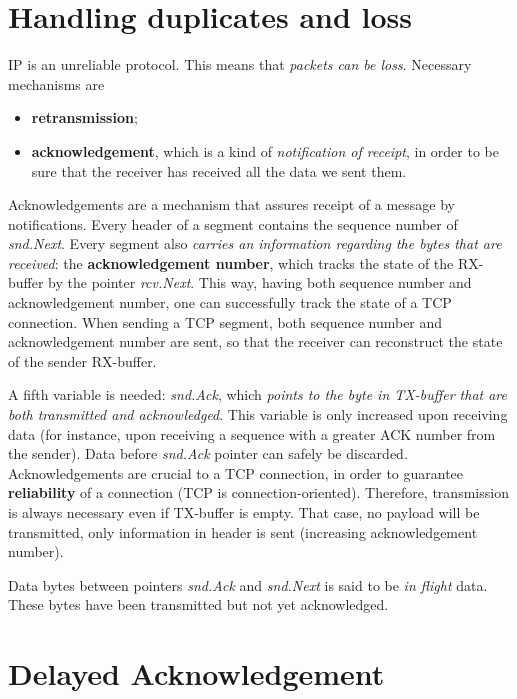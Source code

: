 \documentclass[a4paper, 11pt]{report}
\begin{document}
\section{Handling duplicates and loss}

IP is an unreliable protocol. This means that \emph{packets can be loss}.
Necessary mechanisms are

\begin{itemize}
	\item \textbf{retransmission};
	\item \textbf{acknowledgement}, which is a kind of \emph{notification
		of receipt}, in order to be sure that the receiver has received
		all the data we sent them.
\end{itemize}

Acknowledgements are a mechanism that assures receipt of a message by
notifications. Every header of a segment contains the sequence number of
\emph{snd.Next}. Every segment also \emph{carries an information regarding
the bytes that are received}: the \textbf{acknowledgement number}, which tracks
the state of the RX-buffer by the pointer \emph{rcv.Next}. This way, having
both sequence number and acknowledgement number, one can successfully track the
state of a TCP connection. When sending a TCP segment, both sequence number and
acknowledgement number are sent, so that the receiver can reconstruct the state
of the sender RX-buffer.

A fifth variable is needed: \emph{snd.Ack}, which \emph{points to the byte in
TX-buffer that are both transmitted and acknowledged}. This variable is only
increased upon receiving data (for instance, upon receiving a sequence with a
greater ACK number from the sender). Data before \emph{snd.Ack} pointer can
safely be discarded. Acknowledgements are crucial to a TCP connection, in order
to guarantee \textbf{reliability} of a connection (TCP is connection-oriented).
Therefore, transmission is always necessary even if TX-buffer is empty. That
case, no payload will be transmitted, only information in header is sent
(increasing acknowledgement number). 

Data bytes between pointers \emph{snd.Ack} and \emph{snd.Next} is said to
be \emph{in flight} data. These bytes have been transmitted but not yet
acknowledged.


\section{Delayed Acknowledgement}
\end{document}
